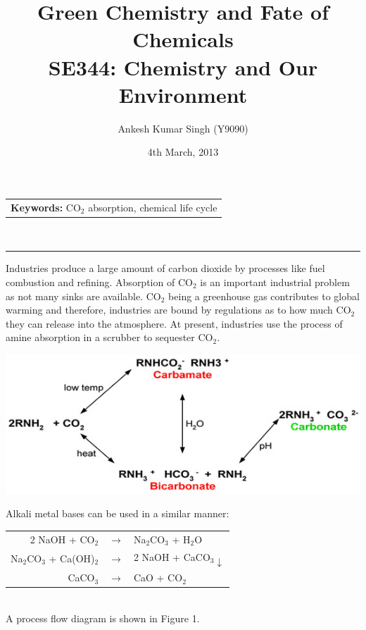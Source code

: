 \documentclass[pdftex,12pt,a4paper]{article}
\title{\vspace{-15pt}Green Chemistry and Fate of Chemicals\\ SE344: Chemistry and Our Environment}
\author{Ankesh Kumar Singh (Y9090)}
\date{4th March, 2013}
\begin{document}
\maketitle
\begin{tabular}{p{370pt}}
\textbf{Keywords: }CO$_2$ absorption, chemical life cycle
\end{tabular}
\vspace{10pt}\\
\hrule
\vspace{10pt}
Industries produce a large amount of carbon dioxide by processes like fuel combustion and refining. Absorption of CO$_2$ is an important industrial problem as not many sinks are available. CO$_2$ being a greenhouse gas contributes to global warming and therefore, industries are bound by regulations as to how much CO$_2$ they can release into the atmosphere. At present, industries use the process of amine absorption in a scrubber to sequester CO$_2$.
\begin{center}
\includegraphics[scale=0.6]{4mari1.jpg}
\end{center}
Alkali metal bases can be used in a similar manner:
\vspace{5pt}\\
\begin{tabular}{rll}
2 NaOH + CO$_2$&$\rightarrow$& Na$_2$CO$_3$ + H$_2$O\\
Na$_2$CO$_3$ + Ca(OH)$_2$&$\rightarrow$&2 NaOH + CaCO$_3\downarrow$\\
CaCO$_3$&$\rightarrow $& CaO + CO$_2$
\end{tabular}\\
A process flow diagram is shown in Figure 1.
\end{document}
